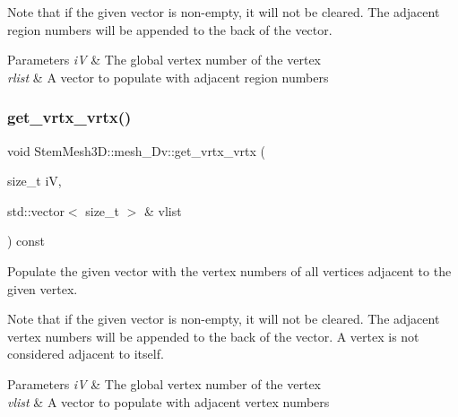 Note that if the given vector is non-\/empty, it will not be cleared. The adjacent region numbers will be appended to the back of the vector. 
\begin{DoxyParams}{Parameters}
{\em iV} & The global vertex number of the vertex \\
\hline
{\em rlist} & A vector to populate with adjacent region numbers \\
\hline
\end{DoxyParams}
\mbox{\label{classStemMesh3D_1_1mesh__3Dv_ae06da20fca1682cf92dd808f2880517f}} 
\subsubsection{\texorpdfstring{get\+\_\+vrtx\+\_\+vrtx()}{get\_vrtx\_vrtx()}}
{\footnotesize\ttfamily void Stem\+Mesh3\+D\+::mesh\+\_\+Dv\+::get\+\_\+vrtx\+\_\+vrtx (\begin{DoxyParamCaption}\item[{size\+\_\+t}]{iV,  }\item[{std\+::vector$<$ size\+\_\+t $>$ \&}]{vlist }\end{DoxyParamCaption}) const}



Populate the given vector with the vertex numbers of all vertices adjacent to the given vertex. 

Note that if the given vector is non-\/empty, it will not be cleared. The adjacent vertex numbers will be appended to the back of the vector. A vertex is not considered adjacent to itself. 
\begin{DoxyParams}{Parameters}
{\em iV} & The global vertex number of the vertex \\
\hline
{\em vlist} & A vector to populate with adjacent vertex numbers \\
\hline
\end{DoxyParams}
\mbox{\label{classStemMesh3D_1_1mesh__3Dv_ae947ad7de0dffd404d5641467bc5fee4}} 
